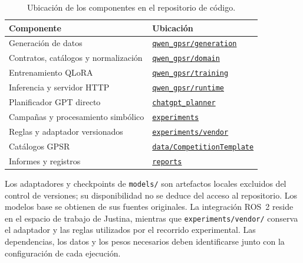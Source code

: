 \begin{table}[htbp]
\centering
\small
\caption{Ubicación de los componentes en el repositorio de código.}
\label{tab:mapa_codigo}
\begin{tabularx}{\textwidth}{@{}p{}X@{}}
\toprule
\textbf{Componente} & \textbf{Ubicación} \\
\midrule
Generación de datos & \href{https://github.com/Biorobotica-UNAM/qwen/tree/3e7fd13b55375d9e776d7a1352673ecf06e45b2a/qwen_gpsr/generation}{\texttt{qwen\_gpsr/\allowbreak generation}} \\
Contratos, catálogos y normalización & \href{https://github.com/Biorobotica-UNAM/qwen/tree/3e7fd13b55375d9e776d7a1352673ecf06e45b2a/qwen_gpsr/domain}{\texttt{qwen\_gpsr/\allowbreak domain}} \\
Entrenamiento QLoRA & \href{https://github.com/Biorobotica-UNAM/qwen/tree/3e7fd13b55375d9e776d7a1352673ecf06e45b2a/qwen_gpsr/training}{\texttt{qwen\_gpsr/\allowbreak training}} \\
Inferencia y servidor HTTP & \href{https://github.com/Biorobotica-UNAM/qwen/tree/3e7fd13b55375d9e776d7a1352673ecf06e45b2a/qwen_gpsr/runtime}{\texttt{qwen\_gpsr/\allowbreak runtime}} \\
Planificador GPT directo & \href{https://github.com/Biorobotica-UNAM/qwen/tree/3e7fd13b55375d9e776d7a1352673ecf06e45b2a/chatgpt_planner}{\texttt{chatgpt\_planner}} \\
Campañas y procesamiento simbólico & \href{https://github.com/Biorobotica-UNAM/qwen/tree/3e7fd13b55375d9e776d7a1352673ecf06e45b2a/experiments}{\texttt{experiments}} \\
Reglas y adaptador versionados & \href{https://github.com/Biorobotica-UNAM/qwen/tree/3e7fd13b55375d9e776d7a1352673ecf06e45b2a/experiments/vendor}{\texttt{experiments/\allowbreak vendor}} \\
Catálogos GPSR & \href{https://github.com/Biorobotica-UNAM/qwen/tree/3e7fd13b55375d9e776d7a1352673ecf06e45b2a/data/CompetitionTemplate}{\texttt{data/\allowbreak CompetitionTemplate}} \\
Informes y registros & \href{https://github.com/Biorobotica-UNAM/qwen/tree/3e7fd13b55375d9e776d7a1352673ecf06e45b2a/reports}{\texttt{reports}} \\
\bottomrule
\end{tabularx}
\end{table}

Los adaptadores y checkpoints de \texttt{models/} son artefactos locales excluidos del control de versiones; su disponibilidad no se deduce del acceso al repositorio. Los modelos base se obtienen de sus fuentes originales. La integración ROS~2 reside en el espacio de trabajo de Justina, mientras que \texttt{experiments/vendor/} conserva el adaptador y las reglas utilizados por el recorrido experimental. Las dependencias, los datos y los pesos necesarios deben identificarse junto con la configuración de cada ejecución.

